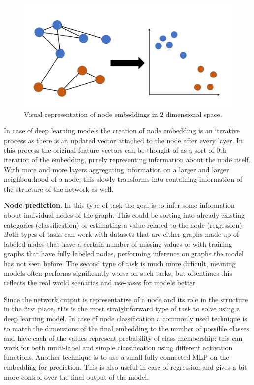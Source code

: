 	\begin{figure}[!h]
		\centering
		\includegraphics[width=\textwidth]{figures/embedding.png}
		\caption{Visual representation of node embeddings in 2 dimensional space.}
		\label{fig:embedding}
	\end{figure}
	
	In case of deep learning models the creation of node embedding is an iterative process as there is an updated vector attached to the node after every layer. In this process the original feature vectors can be thought of as a sort of 0th iteration of the embedding, purely representing information about the node itself. With more and more layers aggregating information on a larger and larger neighbourhood of a node, this slowly transforms into containing information of the structure of the network as well.
	
	\textbf{Node prediction.} In this type of task the goal is to infer some information about individual nodes of the graph. This could be sorting into already existing categories (classification) or estimating a value related to the node (regression). Both types of tasks can work with datasets that are either graphs made up of labeled nodes that have a certain number of missing values or with training graphs that have fully labeled nodes, performing inference on graphs the model has not seen before. The second type of task is much more difficult, meaning models often performs significantly worse on such tasks, but oftentimes this reflects the real world scenarios and use-cases for models better.
	
	Since the network output is representative of a node and its role in the structure in the first place, this is the most straightforward type of task to solve using a deep learning model. In case of node classification a commonly used technique is to match the dimensions of the final embedding to the number of possible classes and have each of the values represent probability of class membership: this can work for both multi-label and simple classification using different activation functions. Another technique is to use a small fully connected MLP on the embedding for prediction. This is also useful in case of regression and gives a bit more control over the final output of the model. 
	
